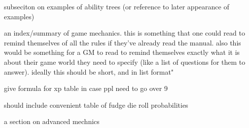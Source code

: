 \documentclass[12pt]{article}
\newcommand{\notes}[1]{{\color{Tan} #1}}
\begin{document}
\notes{subseciton on examples of ability trees (or reference to later appearance of examples)}

\notes{an index/summary of game mechanics. this is something that one could read to remind themselves of all the rules
if they've already read the manual. also this would be something for a GM to read to remind themselves
exactly what it is about their game world they need to specify (like a list of questions for them to answer).
ideally this should be short, and in list format"}


\notes{give formula for xp table in case ppl need to go over 9}

\notes{should include convenient table of fudge die roll probabilities}

\notes{a section on advanced mechnics}

\printindex
\end{document}
